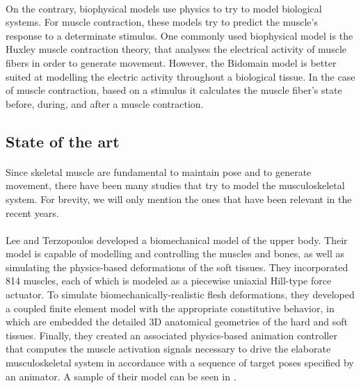 \paragraph{}On the contrary, biophysical models use physics to try to model biological systems. For muscle contraction, these models try to predict the muscle's response to a determinate stimulus. One commonly used biophysical model is the Huxley muscle contraction theory, that analyses the electrical activity of muscle fibers in order to generate movement. However, the Bidomain model \cite{rohrle2010simulating} is better suited at modelling the electric activity throughout a biological tissue. In the case of muscle contraction, based on a stimulus it calculates the muscle fiber's state before, during, and after a muscle contraction.

\subsection{State of the art}

\paragraph{}Since skeletal muscle are fundamental to maintain pose and to generate movement, there have been many studies that try to model the musculoskeletal system. For brevity, we will only mention the ones that have been relevant in the recent years.

\paragraph{}Lee and Terzopoulos \citep{lee2009comprehensive} developed a biomechanical model of the upper body. Their model is capable of modelling and controlling the muscles and bones, as well as simulating the physics-based deformations of the soft tissues. They incorporated 814 muscles, each of which is modeled as a piecewise uniaxial Hill-type force actuator. To simulate biomechanically-realistic flesh deformations, they developed a coupled finite element model with the appropriate constitutive behavior, in which are embedded the detailed 3D anatomical geometries of the hard and soft tissues. Finally, they created an associated physics-based animation controller that computes the muscle activation signals necessary to drive the elaborate musculoskeletal system in accordance with a sequence of target poses specified by an animator. A sample of their model can be seen in .

